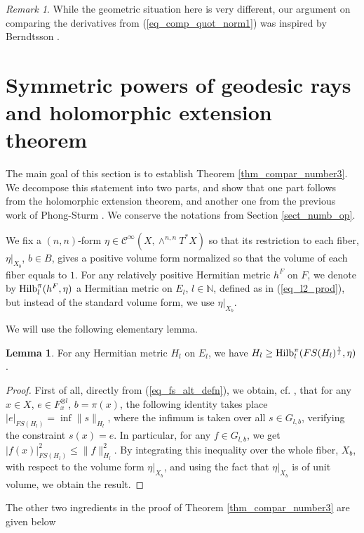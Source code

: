 \documentclass[12pt]{article}
\numberwithin{equation}{section}
\theoremstyle{theorem}
\theoremstyle{definition}
\newtheorem{lem}[thm]{Lemma}
\theoremstyle{remark}
\newtheorem{rem}[thm]{Remark}
\newcommand{\nat}{\mathbb{N}}
\newcommand{\ccal}{\mathscr{C}}
\begin{document}
	\begin{rem}
		While the geometric situation here is very different, our argument on comparing the derivatives from (\ref{eq_comp_quot_norm1}) was inspired by Berndtsson \cite[(3.2) and (3.3)]{BerndtProb}.
	\end{rem}
	
	
	\section{Symmetric powers of geodesic rays and holomorphic extension theorem}\label{sect_test_conf}
	The main goal of this section is to establish Theorem \ref{thm_compar_number3}. 
	We decompose this statement into two parts, and show that one part follows from the holomorphic extension theorem, and another one from the previous work of Phong-Sturm \cite{PhongSturmRegul}.
	We conserve the notations from Section \ref{sect_numb_op}.
	\par 
	We fix a $(n, n)$-form $\eta \in \ccal^{\infty}(X, \wedge^{n, n} T^* X)$ so that its restriction to each fiber, $\eta|_{X_b}$, $b \in B$, gives a positive volume form normalized so that the volume of each fiber equals to $1$.
	For any relatively positive Hermitian metric $h^F$ on $F$, we denote by ${\rm{Hilb}}_l^{\pi}(h^F, \eta)$ a Hermitian metric on $E_l$, $l \in \nat$, defined as in (\ref{eq_l2_prod}), but instead of the standard volume form, we use $\eta|_{X_b}$.
	\par 
	We will use the following elementary lemma.
	\begin{lem}\label{lem_norm_linf}
		For any Hermitian metric $H_l$ on $E_l$, we have $H_l \geq {\rm{Hilb}}_l^{\pi}(FS(H_l)^{\frac{1}{l}}, \eta)$.
	\end{lem}
	\begin{proof}
		First of all, directly from (\ref{eq_fs_alt_defn}), we obtain, cf. \cite[Lemma 2.1]{FinNarSim}, that for any $x \in X$, $e \in F^{\otimes l}_x$, $b = \pi(x)$, the following identity takes place $
			|e|_{FS(H_l)}
			=
			\inf
			\| s \|_{H_l}$,
		where the infimum is taken over all $s \in G_{l, b}$, verifying the constraint $s(x) = e$.
		In particular, for any $f \in G_{l, b}$, we get $|f(x)|_{FS(H_l)}^2 \leq \| f \|_{H_l}^2$.
		By integrating this inequality over the whole fiber, $X_b$, with respect to the volume form $\eta|_{X_b}$, and using the fact that $\eta|_{X_b}$ is of unit volume, we obtain the result.
	\end{proof}
	\par 
	The other two ingredients in the proof of Theorem \ref{thm_compar_number3} are given below
\end{document}
